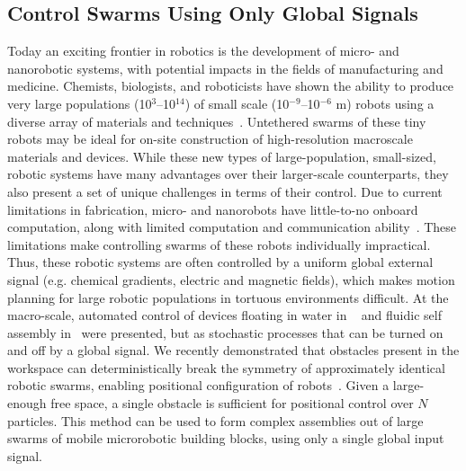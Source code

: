 \subsection{Control Swarms Using Only Global Signals}
Today an exciting frontier in robotics is the development of micro- and nanorobotic systems, with potential impacts in the fields of manufacturing and medicine. 
Chemists, biologists, and roboticists have shown the ability to produce very large populations (10$^3$--10$^{14}$) of small scale (10$^{-9}$--10$^{-6}$ m) robots using a diverse array of materials and techniques~\cite{rubenstein2012kilobot,ou2013motion,chiang2011toward}. 
Untethered swarms of these tiny robots may be ideal for on-site construction of high-resolution macroscale materials and devices. 
While these new types of large-population, small-sized, robotic systems have many advantages over their larger-scale counterparts, they also present a set of unique challenges in terms of their control. 
Due to  current limitations in fabrication, micro- and nanorobots have little-to-no onboard computation, along with limited computation and communication ability~\cite{chiang2011toward, chowdhury2015controlling, donald2013planning}.  
These limitations make controlling swarms of these robots individually impractical. 
Thus, these robotic systems are often controlled by a uniform global external signal (e.g. chemical gradients, electric and magnetic fields), which makes motion planning for large robotic populations in tortuous environments difficult.
At the macro-scale, automated control of devices floating in water in ~\cite{mermoud2012real} and fluidic self assembly in~\cite{mastrangeli2014automated} were presented, but as stochastic processes that can be turned on and off by a global signal.
We recently demonstrated that obstacles present in the workspace can deterministically break the symmetry of approximately identical robotic swarms, enabling positional configuration of robots~\cite{becker2013massive}. 
 Given a large-enough free space, a single obstacle is sufficient for positional control over $N$ particles.  
This method can be used to form complex assemblies out of large swarms of mobile microrobotic building blocks, using only a single global input signal.

